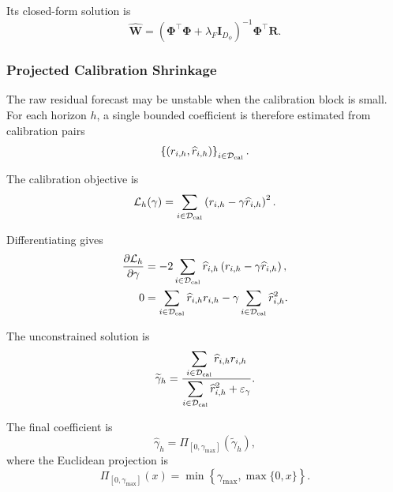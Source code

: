 \documentclass[review,number,sort&compress]{elsarticle}
\begin{document}
Its closed-form solution is
\begin{equation}
    \widehat{\bm{W}}
    =
    \left(
    \bm{\Phi}^\top\bm{\Phi}
    +
    \lambda_F\bm{I}_{D_\phi}
    \right)^{-1}
    \bm{\Phi}^\top\bm{R}.
    \label{eq:fast_ridge_solution}
\end{equation}

\subsubsection{Projected Calibration Shrinkage}

The raw residual forecast may be unstable when the calibration block is small.
For each horizon $h$, a single bounded coefficient is therefore estimated from
calibration pairs
\begin{equation}
    \left\{
    \left(
    r_{i,h},
    \widehat{r}_{i,h}
    \right)
    \right\}_{i\in\mathcal{D}_{\mathrm{cal}}}.
\end{equation}

The calibration objective is
\begin{equation}
    \mathcal{L}_h(\gamma)
    =
    \sum_{i\in\mathcal{D}_{\mathrm{cal}}}
    \left(
    r_{i,h}
    -
    \gamma\widehat{r}_{i,h}
    \right)^2.
    \label{eq:gamma_loss}
\end{equation}

Differentiating gives
\begin{align}
    \frac{\partial\mathcal{L}_h}{\partial\gamma}
    &=
    -2
    \sum_{i\in\mathcal{D}_{\mathrm{cal}}}
    \widehat{r}_{i,h}
    \left(
    r_{i,h}
    -
    \gamma\widehat{r}_{i,h}
    \right),
    \\
    0
    &=
    \sum_{i\in\mathcal{D}_{\mathrm{cal}}}
    \widehat{r}_{i,h}r_{i,h}
    -
    \gamma
    \sum_{i\in\mathcal{D}_{\mathrm{cal}}}
    \widehat{r}_{i,h}^2.
\end{align}

The unconstrained solution is
\begin{equation}
    \widetilde{\gamma}_h
    =
    \frac{
        \displaystyle
        \sum_{i\in\mathcal{D}_{\mathrm{cal}}}
        \widehat{r}_{i,h}r_{i,h}
    }{
        \displaystyle
        \sum_{i\in\mathcal{D}_{\mathrm{cal}}}
        \widehat{r}_{i,h}^2+\varepsilon_\gamma
    }.
    \label{eq:fast_gamma_raw}
\end{equation}

The final coefficient is
\begin{equation}
    \widehat{\gamma}_h
    =
    \Pi_{[0,\gamma_{\max}]}
    \left(
    \widetilde{\gamma}_h
    \right),
    \label{eq:fast_gamma_projected}
\end{equation}
where the Euclidean projection is
\begin{equation}
    \Pi_{[0,\gamma_{\max}]}(x)
    =
    \min
    \left\{
    \gamma_{\max},
    \max\{0,x\}
    \right\}.
    \label{eq:projection_operator}
\end{equation}
\end{document}
